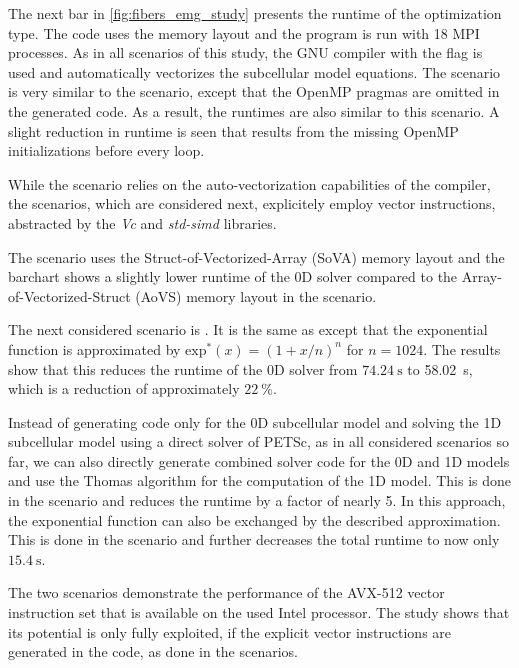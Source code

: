 The next bar in \cref{fig:fibers_emg_study} presents the runtime of the  optimization type. The code uses the  memory layout and the program is run with 18 MPI processes. As in all scenarios of this study, the GNU compiler with the  flag is used and automatically vectorizes the subcellular model equations. The  scenario is very similar to the  scenario, except that the OpenMP pragmas are omitted in the generated code. As a result, the runtimes are also similar to this scenario. A slight reduction in runtime is seen that results from the missing OpenMP initializations before every loop.

While the  scenario relies on the auto-vectorization capabilities of the compiler, the  scenarios, which are considered next, explicitely employ vector instructions, abstracted by the \emph{Vc} and \emph{std-simd} libraries. 

The  scenario uses the Struct-of-Vectorized-Array (SoVA) memory layout and the barchart shows a slightly lower runtime of the 0D solver compared to the Array-of-Vectorized-Struct (AoVS) memory layout in the  scenario.

The next considered scenario is . It is the same as  except that the exponential function is approximated by $\textrm{exp}^\ast(x)=(1+x/n)^n$ for $n=1024$. The results show that this reduces the runtime of the 0D solver from $\SI{74.24}{\s}$ to \SI{58.02}{\s}, which is a reduction of approximately $\SI{22}{\percent}$.

Instead of generating code only for the 0D subcellular model and solving the 1D subcellular model using a direct solver of PETSc, as in all considered scenarios so far, we can also directly generate combined solver code for the 0D and 1D models and use the Thomas algorithm for the computation of the 1D model. This is done in the  scenario and reduces the runtime by a factor of nearly 5. In this approach, the exponential function can also be exchanged by the described approximation. This is done in the  scenario and further decreases the total runtime to now only $\SI{15.4}{\s}$.

The two  scenarios demonstrate the performance of the AVX-512 vector instruction set that is available on the used Intel processor. The study shows that its potential is only fully exploited, if the explicit vector instructions are generated in the code, as done in the  scenarios.

